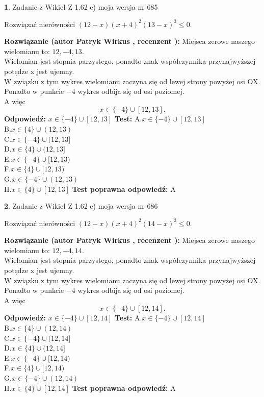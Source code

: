 \documentclass[12pt, a4paper]{article}
\theoremstyle{definition} %
\newtheorem{zad}{}
\newcommand{\zadStart}[1]{\begin{zad}#1\newline}
\newcommand{\zadStop}{\end{zad}}
\newcommand{\rozwStart}[2]{\noindent \textbf{Rozwiązanie (autor #1 , recenzent #2): }\newline}
\newcommand{\rozwStop}{\newline}
\newcommand{\odpStart}{\noindent \textbf{Odpowiedź:}\newline}
\newcommand{\odpStop}{\newline}
\newcommand{\testStart}{\noindent \textbf{Test:}\newline}
\newcommand{\testStop}{\newline}
\newcommand{\kluczStart}{\noindent \textbf{Test poprawna odpowiedź:}\newline}
\newcommand{\kluczStop}{\newline}
\begin{document}
\zadStart{Zadanie z Wikieł Z 1.62 c) moja wersja nr 685}

Rozwiązać nierówności $(12-x)(x+4)^{2}(13-x)^{3}\le0$.
\zadStop
\rozwStart{Patryk Wirkus}{}
Miejsca zerowe naszego wielomianu to: $12, -4, 13$.\\
Wielomian jest stopnia parzystego, ponadto znak współczynnika przy\linebreak najwyższej potędze x jest ujemny.\\ W związku z tym wykres wielomianu zaczyna się od lewej strony powyżej osi OX.\\
Ponadto w punkcie $-4$ wykres odbija się od osi poziomej.\\
A więc $$x \in \{-4\} \cup [12,13].$$
\rozwStop
\odpStart
$x \in \{-4\} \cup [12,13]$
\odpStop
\testStart
A.$x \in \{-4\} \cup [12,13]$\\
B.$x \in \{4\} \cup (12,13)$\\
C.$x \in \{-4\} \cup (12,13]$\\
D.$x \in \{4\} \cup (12,13]$\\
E.$x \in \{-4\} \cup [12,13)$\\
F.$x \in \{4\} \cup [12,13)$\\
G.$x \in \{-4\} \cup (12,13)$\\
H.$x \in \{4\} \cup [12,13]$
\testStop
\kluczStart
A
\kluczStop



\zadStart{Zadanie z Wikieł Z 1.62 c) moja wersja nr 686}

Rozwiązać nierówności $(12-x)(x+4)^{2}(14-x)^{3}\le0$.
\zadStop
\rozwStart{Patryk Wirkus}{}
Miejsca zerowe naszego wielomianu to: $12, -4, 14$.\\
Wielomian jest stopnia parzystego, ponadto znak współczynnika przy\linebreak najwyższej potędze x jest ujemny.\\ W związku z tym wykres wielomianu zaczyna się od lewej strony powyżej osi OX.\\
Ponadto w punkcie $-4$ wykres odbija się od osi poziomej.\\
A więc $$x \in \{-4\} \cup [12,14].$$
\rozwStop
\odpStart
$x \in \{-4\} \cup [12,14]$
\odpStop
\testStart
A.$x \in \{-4\} \cup [12,14]$\\
B.$x \in \{4\} \cup (12,14)$\\
C.$x \in \{-4\} \cup (12,14]$\\
D.$x \in \{4\} \cup (12,14]$\\
E.$x \in \{-4\} \cup [12,14)$\\
F.$x \in \{4\} \cup [12,14)$\\
G.$x \in \{-4\} \cup (12,14)$\\
H.$x \in \{4\} \cup [12,14]$
\testStop
\kluczStart
A
\kluczStop
\end{document}
